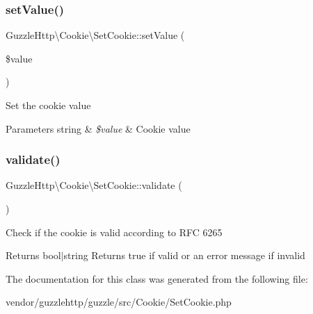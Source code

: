 \subsubsection{\texorpdfstring{set\+Value()}{setValue()}}
{\footnotesize\ttfamily Guzzle\+Http\textbackslash{}\+Cookie\textbackslash{}\+Set\+Cookie\+::set\+Value (\begin{DoxyParamCaption}\item[{}]{\$value }\end{DoxyParamCaption})}

Set the cookie value


\begin{DoxyParams}[1]{Parameters}
string & {\em \$value} & Cookie value \\
\hline
\end{DoxyParams}
\mbox{\label{classGuzzleHttp_1_1Cookie_1_1SetCookie_a37795fbc25a1dde09afaded419f8fb18}} 
\subsubsection{\texorpdfstring{validate()}{validate()}}
{\footnotesize\ttfamily Guzzle\+Http\textbackslash{}\+Cookie\textbackslash{}\+Set\+Cookie\+::validate (\begin{DoxyParamCaption}{ }\end{DoxyParamCaption})}

Check if the cookie is valid according to R\+FC 6265

\begin{DoxyReturn}{Returns}
bool$\vert$string Returns true if valid or an error message if invalid 
\end{DoxyReturn}


The documentation for this class was generated from the following file\+:\begin{DoxyCompactItemize}
\item 
vendor/guzzlehttp/guzzle/src/\+Cookie/Set\+Cookie.\+php\end{DoxyCompactItemize}
